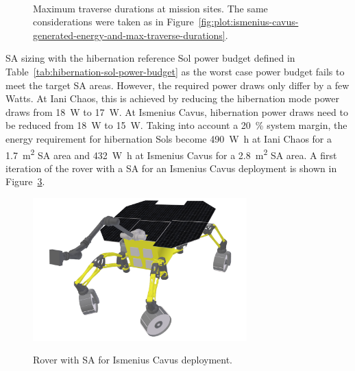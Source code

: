 \documentclass[twocolumn,letterpaper]{IEEEAerospaceCLS}  %
\newcommand{\refFig}[1]{{Figure}~\ref{#1}} %
\newcommand{\refTab}[1]{{Table}~\ref{#1}}  %
\newlength{\subfigureWidth}
\begin{document}
\begin{figure}[h]
\begin{subfigure}[t]{\subfigureWidth}
    \label{fig:plot:sub:final-maximum-traverse-durations-ismenius-cavus}
  \end{subfigure}\\[0.8ex]
  \caption{Maximum traverse durations at mission sites. The same considerations were taken as in \refFig{fig:plot:ismenius-cavus-generated-energy-and-max-traverse-durations}.}
  \label{fig:plot:final-maximum-traverse-durations-at-missions-sites}
\end{figure}

\ac{SA} sizing with the hibernation reference Sol power budget defined in \refTab{tab:hibernation-sol-power-budget} as the worst case power budget fails to meet the target \ac{SA} areas. However, the required power draws only differ by a few Watts. At Iani Chaos, this is achieved by reducing the hibernation mode power draws from \SI{18}{\watt} to \SI{17}{\watt}. At Ismenius Cavus, hibernation power draws need to be reduced from \SI{18}{\watt} to \SI{15}{\watt}. Taking into account a \SI{20}{\percent} system margin, the energy requirement for hibernation Sols become \SI{490}{\watt\hour} at Iani Chaos for a \SI{1.7}{m^{2}} \ac{SA} area and \SI{432}{\watt\hour} at Ismenius Cavus for a \SI{2.8}{m^{2}} \ac{SA} area. A first iteration of the rover with a \ac{SA} for an Ismenius Cavus deployment is shown in \refFig{fig:solar-array-on-ismenius-cavus-chaos}.


\begin{figure}[h]
 \centering
 \includegraphics[width=3.25in]{figures/images/ismenius-cavus-10deg-pitch.png}\\
 \caption{Rover with \ac{SA} for Ismenius Cavus deployment.}
 \label{fig:solar-array-on-ismenius-cavus-chaos}
\end{figure}



\end{document}
